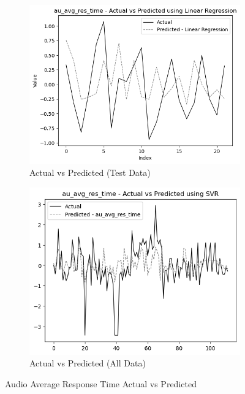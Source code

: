 \begin{figure}[htbp]
    \centering
    \begin{subfigure}[b]{0.49\textwidth}
        \centering
        \includegraphics[width=\textwidth]{images/test_data_audio_average_response_time.png}
        \caption{Actual vs Predicted (Test Data)}
        \label{fig:actual_vs_predicted_au_avg_res_time_test}
    \end{subfigure}\hfill
    \begin{subfigure}[b]{0.49\textwidth}
        \centering
        \includegraphics[width=\textwidth]{images/all_data_audio_average_response_time.png}
        \caption{Actual vs Predicted (All Data)}
        \label{fig:actual_vs_predicted_au_avg_res_time_all_data}
    \end{subfigure}
    \caption{Audio Average Response Time Actual vs Predicted}
    \label{fig:audio_avg_response_time_comparison}
\end{figure}

